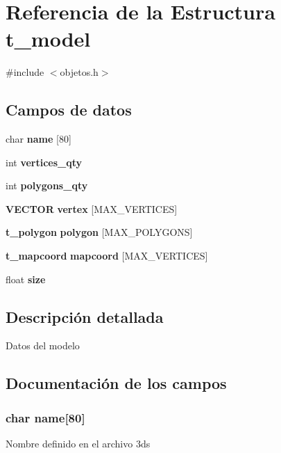 \section{Referencia de la Estructura t\_\-model}
\label{structt__model}


{\ttfamily \#include $<$objetos.h$>$}\subsection*{Campos de datos}
\begin{DoxyCompactItemize}
\item 
char {\bf name} [80]
\item 
int {\bf vertices\_\-qty}
\item 
int {\bf polygons\_\-qty}
\item 
{\bf VECTOR} {\bfseries vertex} [MAX\_\-VERTICES]\label{structt__model_a87e888832dd0a6f3c92149951a6fb035}

\item 
{\bf t\_\-polygon} {\bfseries polygon} [MAX\_\-POLYGONS]\label{structt__model_a567db3731e791152a87c8eb96f04b2ec}

\item 
{\bf t\_\-mapcoord} {\bfseries mapcoord} [MAX\_\-VERTICES]\label{structt__model_a433d1c0df3f3a8b6f5bd2cb173fb573c}

\item 
float {\bfseries size}\label{structt__model_aa6ea9b07932df851a61fa72bd01761fe}

\end{DoxyCompactItemize}


\subsection{Descripción detallada}
Datos del modelo 

\subsection{Documentación de los campos}
\subsubsection[{name}]{\setlength{\rightskip}{0pt plus 5cm}char {\bf name}[80]}\label{structt__model_a3777dbae63a15da001b2baa317a25149}
Nombre definido en el archivo 3ds 
